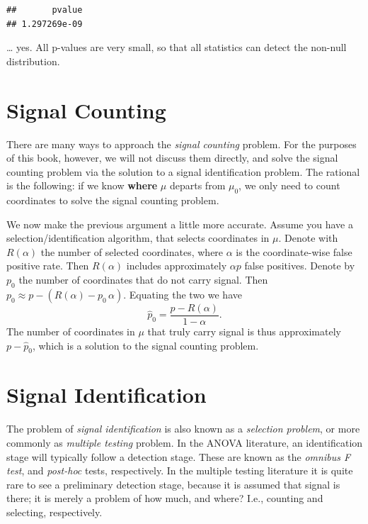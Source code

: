 \documentclass[]{book}
\theoremstyle{definition}
\theoremstyle{definition}
\theoremstyle{definition}
\theoremstyle{remark}
\begin{document}
\begin{verbatim}
##       pvalue 
## 1.297269e-09
\end{verbatim}

\ldots{} yes. All p-values are very small, so that all statistics can detect the non-null distribution.

\hypertarget{signal-counting}{%
\section{Signal Counting}\label{signal-counting}}

There are many ways to approach the \emph{signal counting} problem.
For the purposes of this book, however, we will not discuss them directly, and solve the signal counting problem via the solution to a signal identification problem.
The rational is the following: if we know \textbf{where} \(\mu\) departs from \(\mu_0\), we only need to count coordinates to solve the signal counting problem.

We now make the previous argument a little more accurate.
Assume you have a selection/identification algorithm, that selects coordinates in \(\mu\).
Denote with \(R(\alpha)\) the number of selected coordinates, where \(\alpha\) is the coordinate-wise false positive rate.
Then \(R(\alpha)\) includes approximately \(\alpha p\) false positives.
Denote by \(p_0\) the number of coordinates that do not carry signal.
Then \(p_0 \approx p-(R(\alpha)-p_0 \, \alpha)\).
Equating the two we have \[\hat p_0=\frac{p-R(\alpha)}{1-\alpha}.\]
The number of coordinates in \(\mu\) that truly carry signal is thus approximately \(p-\hat p_0\), which is a solution to the signal counting problem.

\hypertarget{identification}{%
\section{Signal Identification}\label{identification}}

The problem of \emph{signal identification} is also known as a \emph{selection problem}, or more commonly as \emph{multiple testing} problem.
In the ANOVA literature, an identification stage will typically follow a detection stage.
These are known as the \emph{omnibus F test}, and \emph{post-hoc} tests, respectively.
In the multiple testing literature it is quite rare to see a preliminary detection stage, because it is assumed that signal is there; it is merely a problem of how much, and where?
I.e., counting and selecting, respectively.
\end{document}
